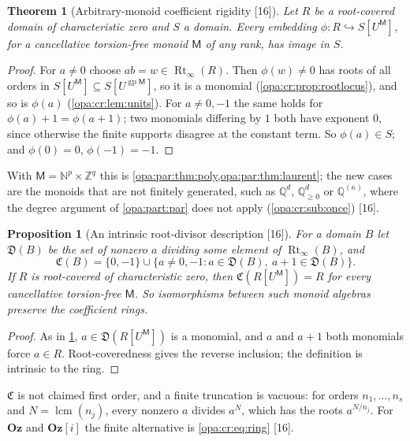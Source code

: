 \documentclass[11pt,oneside]{article}
\numberwithin{equation}{section}
\newtheorem{theorem}{Theorem}[section]
\newtheorem{proposition}[proposition]{Proposition}
\theoremstyle{definition}
\theoremstyle{remark}
\newcommand{\Oz}{\mathbf{Oz}}
\newcommand{\Og}{\mathbf{Oz}[i]}
\newcommand{\Q}{\mathbb Q}
\newcommand{\Z}{\mathbb Z}
\newcommand{\N}{\mathbb N}
\newcommand{\src}[1]{\textup{\textsf{\small[#1]}}}
\begin{document}
\begin{theorem}[Arbitrary-monoid coefficient rigidity \src{16}]\label{opa:cr:thm:rootembedding}
Let $R$ be a root-covered domain of characteristic zero and $S$ a domain. Every embedding
$\phi:R\hookrightarrow S[U^{\mathsf M}]$, for a cancellative torsion-free monoid $\mathsf M$ of any rank, has image in $S$.
\end{theorem}
\begin{proof}
For $a\ne0$ choose $ab=w\in\operatorname{Rt}_\infty(R)$. Then $\phi(w)\ne0$ has roots of all orders in
$S[U^{\mathsf M}]\subseteq S[U^{\operatorname{gp}\mathsf M}]$, so it is a monomial (\cref{opa:cr:prop:rootlocus}), and so is
$\phi(a)$ (\cref{opa:cr:lem:units}). For $a\ne0,-1$ the same holds for $\phi(a)+1=\phi(a+1)$; two monomials differing by
$1$ both have exponent $0$, since otherwise the finite supports disagree at the constant term. So $\phi(a)\in S$; and
$\phi(0)=0$, $\phi(-1)=-1$.
\end{proof}

With $\mathsf M=\N^p\times\Z^q$ this is \cref{opa:par:thm:poly,opa:par:thm:laurent}; the new cases are the monoids that are
not finitely generated, such as $\Q^d$, $\Q_{\ge0}^d$ or $\Q^{(\kappa)}$, where the degree argument of
\cref{opa:part:par} does not apply (\cref{opa:cr:sub:once}) \src{16}.

\begin{proposition}[An intrinsic root-divisor description \src{16}]\label{opa:cr:prop:rootcore}
For a domain $B$ let $\mathfrak D(B)$ be the set of nonzero $a$ dividing some element of $\operatorname{Rt}_\infty(B)$, and
\[
 \mathfrak C(B)=\{0,-1\}\cup\{a\ne0,-1:a\in\mathfrak D(B),\ a+1\in\mathfrak D(B)\}.
\]
If $R$ is root-covered of characteristic zero, then $\mathfrak C(R[U^{\mathsf M}])=R$ for every cancellative torsion-free
$\mathsf M$. So isomorphisms between such monoid algebras preserve the coefficient rings.
\end{proposition}
\begin{proof}
As in \cref{opa:cr:thm:rootembedding}, $a\in\mathfrak D(R[U^{\mathsf M}])$ is a monomial, and $a$ and $a+1$ both monomials force
$a\in R$. Root-coveredness gives the reverse inclusion; the definition is intrinsic to the ring.
\end{proof}

$\mathfrak C$ is not claimed first order, and a finite truncation is vacuous: for orders $n_1,\dots,n_s$ and
$N=\operatorname{lcm}(n_j)$, every nonzero $a$ divides $a^N$, which has the roots $a^{N/n_j}$. For $\Oz$ and $\Og$ the finite
alternative is \eqref{opa:cr:eq:ring} \src{16}.
\end{document}
